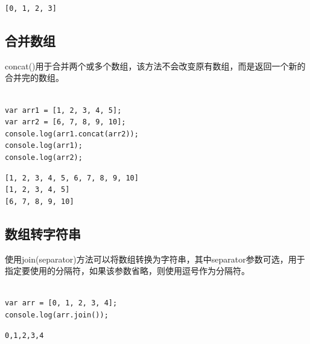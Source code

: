 \begin{tcolorbox}
	\begin{verbatim}
[0, 1, 2, 3]
	\end{verbatim}
\end{tcolorbox}

\vspace{0.5cm}

\subsection{合并数组}

concat()用于合并两个或多个数组，该方法不会改变原有数组，而是返回一个新的合并完的数组。\\

\\

\begin{lstlisting}[style=htmlcssjs]
var arr1 = [1, 2, 3, 4, 5];
var arr2 = [6, 7, 8, 9, 10];
console.log(arr1.concat(arr2));
console.log(arr1);
console.log(arr2);
\end{lstlisting}

\begin{tcolorbox}
	\begin{verbatim}
[1, 2, 3, 4, 5, 6, 7, 8, 9, 10]
[1, 2, 3, 4, 5]
[6, 7, 8, 9, 10]
	\end{verbatim}
\end{tcolorbox}

\vspace{0.5cm}

\subsection{数组转字符串}

使用join(separator)方法可以将数组转换为字符串，其中separator参数可选，用于指定要使用的分隔符，如果该参数省略，则使用逗号作为分隔符。\\

\\

\begin{lstlisting}[style=htmlcssjs]
var arr = [0, 1, 2, 3, 4];
console.log(arr.join());
\end{lstlisting}

\begin{tcolorbox}
	\begin{verbatim}
0,1,2,3,4
	\end{verbatim}
\end{tcolorbox}

